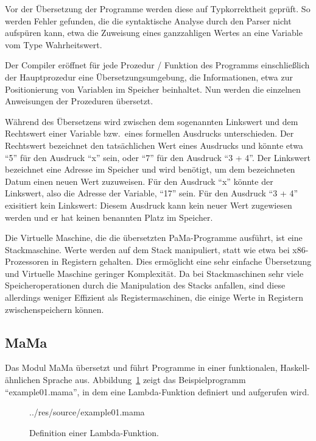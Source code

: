 \documentclass[german, a4paper, parskip, bibliography=totoc]{scrartcl}
\begin{document}
Vor der Übersetzung der Programme werden diese auf Typkorrektheit geprüft. So
werden Fehler gefunden, die die syntaktische Analyse durch den Parser nicht
aufspüren kann, etwa die Zuweisung eines ganzzahligen Wertes an eine Variable
vom Type Wahrheitswert.

Der Compiler eröffnet für jede Prozedur / Funktion des Programms
einschließlich der Hauptprozedur eine Übersetzungsumgebung, die Informationen,
etwa zur Positionierung von Variablen im Speicher beinhaltet. Nun werden die
einzelnen Anweisungen der Prozeduren übersetzt.

Während des Übersetzens wird zwischen dem sogenannten Linkswert und dem
Rechtswert einer Variable bzw.\ eines formellen Ausdrucks unterschieden. Der
Rechtswert bezeichnet den tatsächlichen Wert eines Ausdrucks und könnte etwa
\enquote{5} für den Ausdruck \enquote{x} sein, oder \enquote{7} für den
Ausdruck \enquote{3 + 4}. Der Linkswert bezeichnet eine Adresse im Speicher und
wird benötigt, um dem bezeichneten Datum einen neuen Wert zuzuweisen. Für den
Ausdruck \enquote{x} könnte der Linkswert, also die Adresse der Variable,
\enquote{17} sein. Für den Ausdruck \enquote{3 + 4} exisitiert kein Linkswert:
Diesem Ausdruck kann kein neuer Wert zugewiesen werden und er hat keinen
benannten Platz im Speicher.

Die Virtuelle Maschine, die die übersetzten PaMa-Programme ausführt, ist eine
Stackmaschine. Werte werden auf dem Stack manipuliert, statt wie etwa bei
x86-Prozessoren in Registern gehalten. Dies ermöglicht eine sehr einfache
Übersetzung und Virtuelle Maschine geringer Komplexität. Da bei
Stackmaschinen sehr viele Speicheroperationen durch die Manipulation des Stacks
anfallen, sind diese allerdings weniger Effizient als Registermaschinen, die
einige Werte in Registern zwischenspeichern können.


\subsection{MaMa}
Das Modul MaMa übersetzt und führt Programme in einer funktionalen,
Haskell-ähnlichen Sprache aus. Abbildung~\ref{code_mama} zeigt das
Beispielprogramm \enquote{example01.mama}, in dem eine Lambda-Funktion
definiert und aufgerufen wird.

\begin{figure}[htb]
    
        {../res/source/example01.mama}
    \caption{Definition einer Lambda-Funktion.}
    \label{code_mama}
\end{figure}
\end{document}
